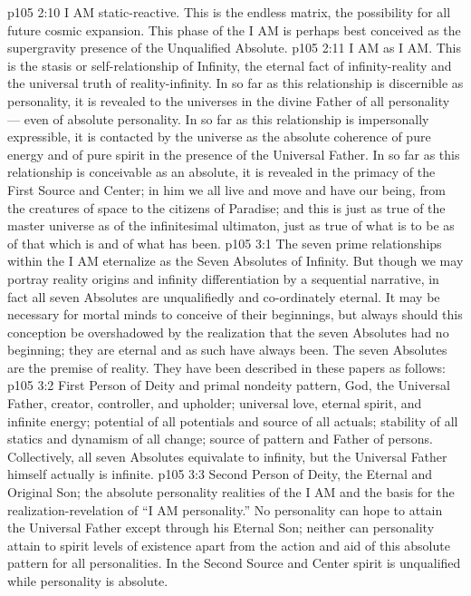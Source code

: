 \vs p105 2:10 \pc {}\bibnobreakspace {} I AM static\hyp{}reactive. This is the endless matrix, the possibility for all future cosmic expansion. This phase of the I AM is perhaps best conceived as the supergravity presence of the Unqualified Absolute.
\vs p105 2:11 \pc {}\bibnobreakspace {} I AM as I AM. This is the stasis or self\hyp{}relationship of Infinity, the eternal fact of infinity\hyp{}reality and the universal truth of reality\hyp{}infinity. In so far as this relationship is discernible as personality, it is revealed to the universes in the divine Father of all personality --- even of absolute personality. In so far as this relationship is impersonally expressible, it is contacted by the universe as the absolute coherence of pure energy and of pure spirit in the presence of the Universal Father. In so far as this relationship is conceivable as an absolute, it is revealed in the primacy of the First Source and Center; in him we all live and move and have our being, from the creatures of space to the citizens of Paradise; and this is just as true of the master universe as of the infinitesimal ultimaton, just as true of what is to be as of that which is and of what has been.
\vs p105 3:1 The seven prime relationships within the I AM eternalize as the Seven Absolutes of Infinity. But though we may portray reality origins and infinity differentiation by a sequential narrative, in fact all seven Absolutes are unqualifiedly and co\hyp{}ordinately eternal. It may be necessary for mortal minds to conceive of their beginnings, but always should this conception be overshadowed by the realization that the seven Absolutes had no beginning; they are eternal and as such have always been. The seven Absolutes are the premise of reality. They have been described in these papers as follows:
\vs p105 3:2 \bibnobreakspace {} First Person of Deity and primal nondeity pattern, God, the Universal Father, creator, controller, and upholder; universal love, eternal spirit, and infinite energy; potential of all potentials and source of all actuals; stability of all statics and dynamism of all change; source of pattern and Father of persons. Collectively, all seven Absolutes equivalate to infinity, but the Universal Father himself actually is infinite.
\vs p105 3:3 \pc {}\bibnobreakspace {} Second Person of Deity, the Eternal and Original Son; the absolute personality realities of the I AM and the basis for the realization\hyp{}revelation of “I AM personality.” No personality can hope to attain the Universal Father except through his Eternal Son; neither can personality attain to spirit levels of existence apart from the action and aid of this absolute pattern for all personalities. In the Second Source and Center spirit is unqualified while personality is absolute.
